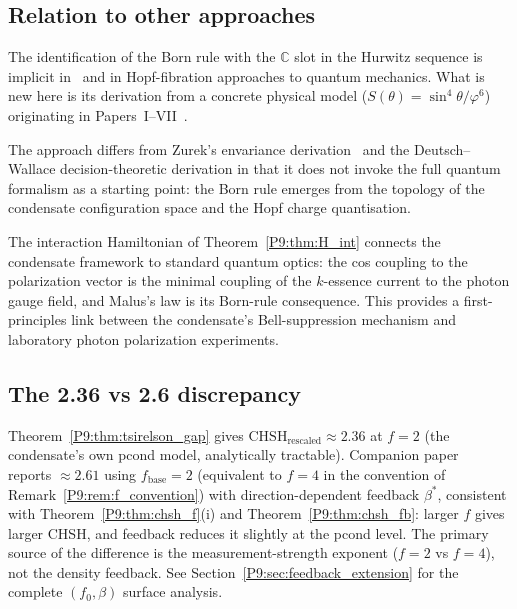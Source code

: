 \documentclass[11pt,a4paper]{article}
\theoremstyle{definition}
\theoremstyle{remark}
\newcommand{\vp}{\varphi}
\newcommand{\bst}{\beta^{*}}
\newcommand{\CC}{\mathbb{C}}
\newcommand{\CHSH}{\mathrm{CHSH}}
\begin{document}
\subsection{Relation to other approaches}
\label{P9:sec:other_approaches}
 
The identification of the Born rule with the $\CC$ slot in the Hurwitz
sequence is implicit in~\cite{Baez2002} and in Hopf-fibration approaches
to quantum mechanics.
What is new here is its derivation from a concrete physical model
($S(\theta)=\sin^4\theta/\vp^6$) originating in
Papers~I--VII~\cite{Paper1,Paper2,Paper3,Paper4,Paper5,Paper6,Paper7}.
 
The approach differs from Zurek's envariance derivation~\cite{Zurek2003}
and the Deutsch--Wallace decision-theoretic derivation in that it does
not invoke the full quantum formalism as a starting point: the Born
rule emerges from the topology of the condensate configuration space
and the Hopf charge quantisation.
 
The interaction Hamiltonian of Theorem~\ref{P9:thm:H_int} connects the
condensate framework to standard quantum optics: the cos coupling to
the polarization vector is the minimal coupling of the $k$-essence
current to the photon gauge field, and Malus's law is its Born-rule
consequence.
This provides a first-principles link between the condensate's
Bell-suppression mechanism and laboratory photon polarization
experiments.
 
\subsection{The 2.36 vs 2.6 discrepancy}
\label{P9:sec:discrepancy}
 
Theorem~\ref{P9:thm:tsirelson_gap} gives $\CHSH_\mathrm{rescaled}\approx2.36$
at $f=2$ (the condensate's own pcond model, analytically tractable).
Companion paper~\cite{Paper8} reports $\approx2.61$
using $f_\mathrm{base}=2$ (equivalent to $f=4$ in the convention
of Remark~\ref{P9:rem:f_convention}) with direction-dependent feedback $\bst$,
consistent with Theorem~\ref{P9:thm:chsh_f}(i) and Theorem~\ref{P9:thm:chsh_fb}:
larger $f$ gives larger CHSH, and feedback reduces it slightly at the
pcond level.
The primary source of the difference is the measurement-strength exponent
($f=2$ vs $f=4$), not the density feedback.
See Section~\ref{P9:sec:feedback_extension} for the complete $(f_0,\beta)$
surface analysis.
 
\end{document}
